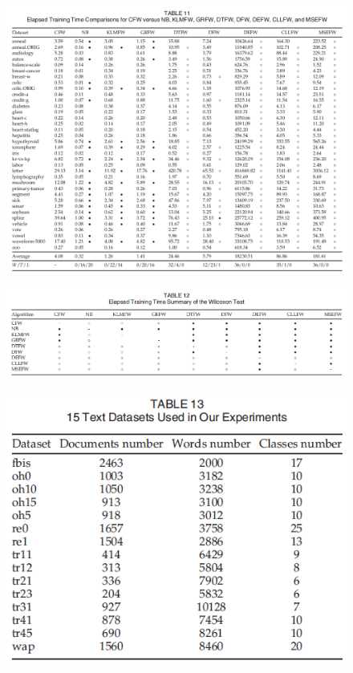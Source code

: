 \documentclass[12pt, a4paper]{article}
\begin{document}
\begin{figure}
    \centering
    \includegraphics[width=\linewidth]{images/article2/table11.png}
    \caption{}
    \label{a2_table11}
\end{figure}

\begin{figure}
    \centering
    \includegraphics[width=\linewidth]{images/article2/table12.png}
    \caption{}
    \label{a2_table12}
\end{figure}

\clearpage

\begin{figure}
    \centering
    \includegraphics[width=\linewidth]{images/article2/table13.png}
    \caption{}
    \label{a2_table13}
\end{figure}
\end{document}

